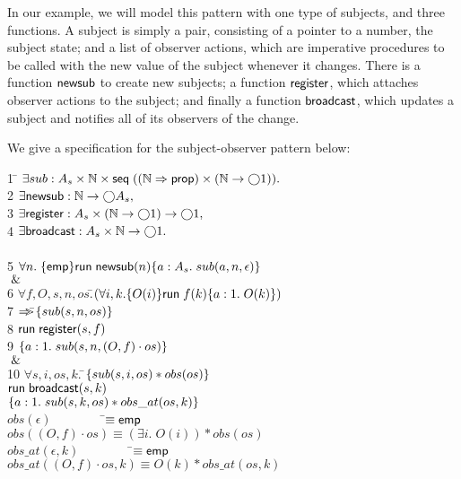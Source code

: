 In our example, we will model this pattern with one type of subjects,
and three functions. A subject is simply a pair, consisting of a
pointer to a number, the subject state; and a list of observer
actions, which are imperative procedures to be called with the new
value of the subject whenever it changes. There is a function
$\mathsf{newsub}$ to create new subjects; a function
$\mathsf{register}$, which attaches observer actions to the subject;
and finally a function $\mathsf{broadcast}$, which updates a subject
and notifies all of its observers of the change. 


We give a specification for the subject-observer pattern below:
%

\begin{tabbing}
1 \qquad \= $\exists sub : A_s \times \mathbb{N} \times \mathsf{seq}\;{((\mathbb{N} \Rightarrow \mathsf{prop}) \times (\mathbb{N} \to \bigcirc{1}))}.$ \\
2 \> $\exists \mathsf{newsub} : \mathbb{N} \to \bigcirc{A_s},$ \\ 
3 \> $\exists \mathsf{register} : A_s \times (\mathbb{N} \to \bigcirc{1}) \to \bigcirc{1},$ \\
4 \> $\exists \mathsf{broadcast} : A_s \times \mathbb{N} \to \bigcirc{1}.$ \\
\\[0.5em]
5 \>$\forall n.\; \{{\mathsf{emp}}\}{\mathsf{run}\;{\mathsf{newsub}(n)}}\{{a:A_s}.\;{sub(a, n, \epsilon)}\}$ \\
\> $\;\&\;$ \\
6 \> $\forall f, O, s, n, os. $\=$(\forall i, k. \{{O(i)}\}{\mathsf{run}\;{f(k)}}\{{a:1}.\;{O(k)}\})$ \\
7\> \>$\Rightarrow\!\!\!>$\=$\{{sub(s, n, os)}\}$ \\
8\> \>          \>$\mathsf{run}\;{\mathsf{register}(s, f)}$ \\
9 \> \>          \>$\{{a:1.\; sub(s, n, (O,f)\cdot os)}\}$ \\
\> $\;\&\;$ \\
10 \> $\forall s,i,os,k.\; $\=$\{{sub(s, i, os) * obs(os)}\}$ \\
  \>                       \>$\mathsf{run}\;{\mathsf{broadcast}}(s,k)$ \\
  \>                       \>$\{{a:1.\; sub(s, k, os) * obs\_at(os, k)}\}$ 
\\[0.5em]
$obs(\epsilon) \;\qquad\qquad $\=$\equiv \mathsf{emp}$ \\
$obs((O,f)\cdot os) $\>$\equiv (\exists i.\; O(i)) * obs(os)$ 
\\[0.5em]
$obs\_at(\epsilon, k) \;\qquad\qquad $\=$\equiv \mathsf{emp}$ \\
$obs\_at((O,f)\cdot os, k) $\>$\equiv O(k) * obs\_at(os, k)$ 
\\
\end{tabbing}

